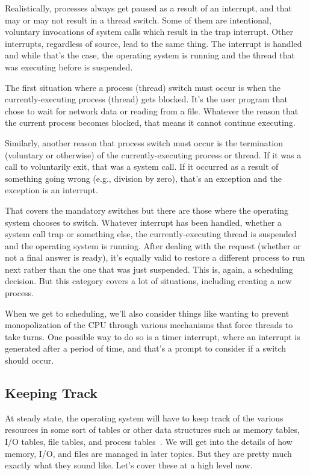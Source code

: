 Realistically, processes always get paused as a result of an interrupt, and that may or may not result in a thread switch. Some of them are intentional, voluntary invocations of system calls which result in the trap interrupt. Other interrupts, regardless of source, lead to the same thing. The interrupt is handled and while that's the case, the operating system is running and the thread that was executing before is suspended. 

The first situation where a process (thread) switch must occur is when the currently-executing process (thread) gets blocked. It's the user program that chose to wait for network data or reading from a file. Whatever the reason that the current process becomes blocked, that means it cannot continue executing.

Similarly, another reason that process switch must occur is the termination (voluntary or otherwise) of the currently-executing process or thread. If it was a call to voluntarily exit, that was a system call. If it occurred as a result of something going wrong (e.g., division by zero), that's an exception and the exception is an interrupt.

That covers the mandatory switches but there are those where the operating system chooses to switch. Whatever interrupt has been handled, whether a system call trap or something else, the currently-executing thread is suspended and the operating system is running. After dealing with the request (whether or not a final answer is ready), it's equally valid to restore a different process to run next rather than the one that was just suspended. This is, again, a scheduling decision. But this category covers a lot of situations, including creating a new process.

When we get to scheduling, we'll also consider things like wanting to prevent monopolization of the CPU through various mechanisms that force threads to take turns. One possible way to do so is a timer interrupt, where an interrupt is generated after a period of time, and that's a prompt to consider if a switch should occur.

\subsection*{Keeping Track}
At steady state, the operating system will have to keep track of the various resources in some sort of tables or other data structures such as memory tables, I/O tables, file tables, and process tables~\cite{osi}. We will get into the details of how memory, I/O, and files are managed in later topics. But they are pretty much exactly what they sound like. Let's cover these at a high level now.

